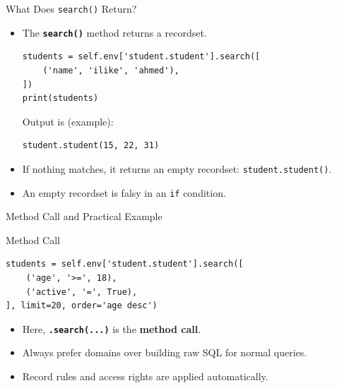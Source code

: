 \begin{frame}[fragile]{What Does \texttt{search()} Return?}
	\begin{block}{}
		\begin{itemize}
			\item The \textbf{\texttt{search()}} method returns a recordset.
\begin{lstlisting}
students = self.env['student.student'].search([
	('name', 'ilike', 'ahmed'),
])
print(students)
\end{lstlisting}
			Output is (example):
\begin{lstlisting}
student.student(15, 22, 31)
\end{lstlisting}
			\item If nothing matches, it returns an empty recordset: \texttt{student.student()}.
			\item An empty recordset is falsy in an \texttt{if} condition.
		\end{itemize}
	\end{block}
\end{frame}

\begin{frame}[fragile]{Method Call and Practical Example}
\begin{block}{Method Call}
\begin{lstlisting}
students = self.env['student.student'].search([
	('age', '>=', 18),
	('active', '=', True),
], limit=20, order='age desc')
\end{lstlisting}
	\begin{itemize}
		\item Here, \textbf{\texttt{.search(...)}} is the \textbf{method call}.
		\item Always prefer domains over building raw SQL for normal queries.
		\item Record rules and access rights are applied automatically.
	\end{itemize}
\end{block}
\end{frame}
